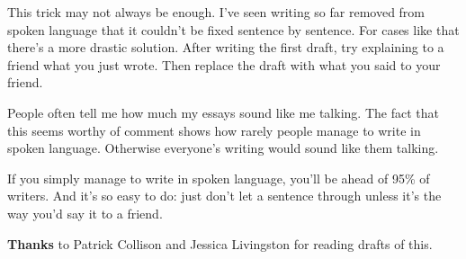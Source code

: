 This
                  trick may not always be enough. I've seen writing so far
                  removed from spoken language that it couldn't be fixed
                  sentence by sentence. For cases like that there's a more
                  drastic solution. After writing the first draft, try
                  explaining to a friend what you just wrote. Then replace the
                  draft with what you said to your friend.

People
                  often tell me how much my essays sound like me talking. The
                  fact that this seems worthy of comment shows how rarely people
                  manage to write in spoken language. Otherwise everyone's
                  writing would sound like them talking.

If you
                  simply manage to write in spoken language, you'll be ahead of
                  95\% of writers. And it's so easy to do: just don't let a
                  sentence through unless it's the way you'd say it to a
                  friend.







\textbf{Thanks}
                  to Patrick Collison and Jessica Livingston for reading drafts
                  of this.


              
            
          
